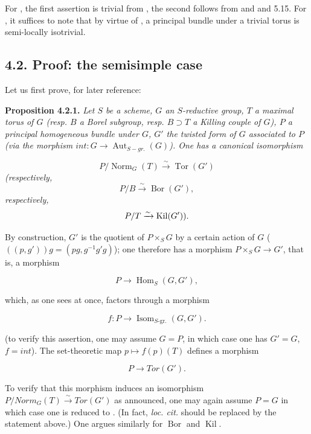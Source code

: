 For , the first assertion is trivial from , the second follows from  and  and 5.15. For , it
suffices to note that by virtue of , a principal bundle under a trivial torus is semi-locally isotrivial.

\subsection*{4.2. Proof: the semisimple case}

Let us first prove, for later reference:

\textbf{Proposition 4.2.1.} \emph{Let \(S\) be a scheme, \(G\) an \(S\)-reductive group, \(T\) a maximal torus of \(G\) (resp. \(B\) a Borel
subgroup, resp. \(B \supset T\) a Killing couple of \(G\)), \(P\) a principal homogeneous bundle under \(G\), \(G'\) the twisted
form of \(G\) associated to \(P\) (via the morphism \(int : G \to \operatorname{Aut}_{S-gr.}(G)\)). One has a canonical
isomorphism}

\[
  P/\operatorname{Norm}_G(T)\xrightarrow{\sim}\operatorname{Tor}(G')
\]
\emph{\textup{(}respectively,}
\[
  P/B\xrightarrow{\sim}\operatorname{Bor}(G'),
\]
\emph{respectively,}
\[
  P/T\xrightarrow{\sim}\operatorname{Kil}(G')\textup{)}.
\]

By construction, \(G'\) is the quotient of \(P \times_{S} G\) by a certain action of \(G\) (\(((p, g')) g = (pg, g^{-1} g'
g)\)); one therefore has a morphism \(P \times_{S} G \to G'\), that is, a morphism

\[ P \to \operatorname{Hom}_{S}(G, G'), \]

which, as one sees at once, factors through a morphism

\[
  f:P\longrightarrow\operatorname{Isom}_{S\text{-}\mathrm{gr.}}(G,G').
\]

(to verify this assertion, one may assume \(G = P\), in which case one has \(G' = G\), \(f = int\)). The set-theoretic map \(p
\mapsto f(p)(T)\) defines a morphism

\[ P \to Tor(G'). \]

To verify that this morphism induces an isomorphism \(P / Norm_{G}(T) \xrightarrow{\sim} Tor(G')\) as announced, one may
again assume \(P = G\) in which case one is reduced to . (In fact, \emph{loc. cit.} should be replaced by
the statement above.) One argues similarly for \(\operatorname{Bor}\) and \(\operatorname{Kil}\).

